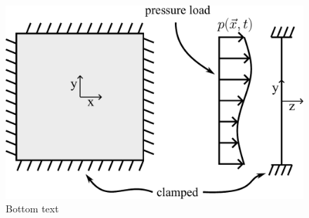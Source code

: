 \begin{figure}
    \centering
    \includegraphics[width=\textwidth]{Chapter/04_method/figures/BC.pdf}
    \caption{Bottom text}
    \label{fig:bc}
\end{figure}